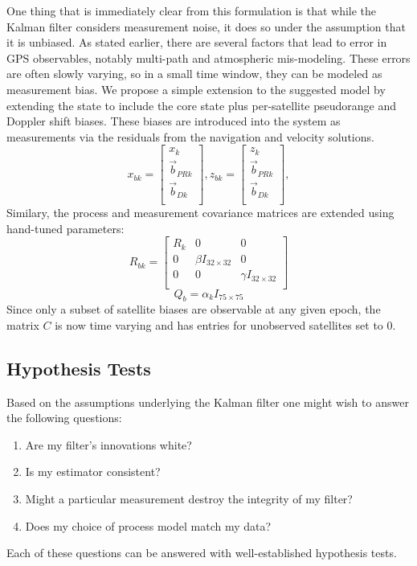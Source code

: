 One thing that is immediately clear from this formulation is that while the Kalman filter considers measurement noise, it does so under the assumption that it is unbiased.  As stated earlier, there are several factors that lead to error in GPS observables, notably multi-path and atmospheric mis-modeling.  These errors are often slowly varying, so in a small time window, they can be modeled as measurement bias.  We propose a simple extension to the suggested model by extending the state to include the core state plus per-satellite pseudorange and Doppler shift biases.  These biases are introduced into the system as measurements via the residuals from the navigation and velocity solutions.
\begin{equation}
x_{bk} = \left[
\begin{array}{c}
x_k\\
\vec{b}_{PRk}\\
\vec{b}_{Dk}\\
\end{array}
\right],
z_{bk} = \left[
\begin{array}{c}
z_k\\
\vec{b}_{PRk}\\
\vec{b}_{Dk}\\
\end{array}
\right],
\end{equation}
Similary, the process and measurement covariance matrices are extended using hand-tuned parameters:
\begin{equation}
R_{bk} = \left[
\begin{array}{ccc}
R_k & 0 & 0\\
0 & \beta I_{32\times32} & 0\\
0 & 0 & \gamma I_{32\times32}\\
\end{array}
\right]
\end{equation}
\[Q_b = \alpha_k I_{75\times75}\]
Since only a subset of satellite biases are observable at any given epoch, the matrix $C$ is now time varying and has entries for unobserved satellites set to $0$.

\subsection{Hypothesis Tests}
Based on the assumptions underlying the Kalman filter one might wish to answer the following questions:
\begin{enumerate}
\item Are my filter's innovations white?
\item Is my estimator consistent?
\item Might a particular measurement destroy the integrity of my filter?
\item Does my choice of process model match my data?
\end{enumerate}
Each of these questions can be answered with well-established hypothesis tests.


